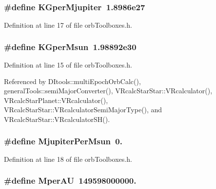 \subsubsection[{K\-Gper\-Mjupiter}]{\setlength{\rightskip}{0pt plus 5cm}\#define K\-Gper\-Mjupiter~1.\-8986e27}\label{orb_toolboxes_8h_ab06efcd5ace405dec01fbf433aab9db1}


Definition at line 17 of file orb\-Toolboxes.\-h.

\subsubsection[{K\-Gper\-Msun}]{\setlength{\rightskip}{0pt plus 5cm}\#define K\-Gper\-Msun~1.\-98892e30}\label{orb_toolboxes_8h_abc3a507fe5d83a094e248e04cdeca200}


Definition at line 15 of file orb\-Toolboxes.\-h.



Referenced by D\-Itools\-::multi\-Epoch\-Orb\-Calc(), general\-Tools\-::semi\-Major\-Converter(), V\-Rcalc\-Star\-Star\-::\-V\-Rcalculator(), V\-Rcalc\-Star\-Planet\-::\-V\-Rcalculator(), V\-Rcalc\-Star\-Star\-::\-V\-Rcalculator\-Semi\-Major\-Type(), and V\-Rcalc\-Star\-Star\-::\-V\-Rcalculator\-S\-H().

\subsubsection[{Mjupiter\-Per\-Msun}]{\setlength{\rightskip}{0pt plus 5cm}\#define Mjupiter\-Per\-Msun~0.}\label{orb_toolboxes_8h_aba0b0a824fcc2e8824b4fe5de417aa7b}


Definition at line 18 of file orb\-Toolboxes.\-h.

\subsubsection[{Mper\-A\-U}]{\setlength{\rightskip}{0pt plus 5cm}\#define Mper\-A\-U~149598000000.}\label{orb_toolboxes_8h_a604a0af0f4e0e0937d76de54094a79f7}


